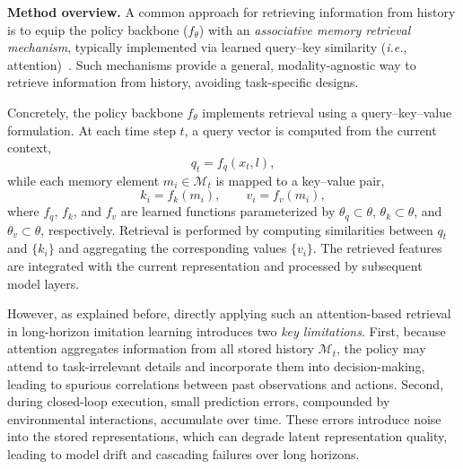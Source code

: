 
\vspace{0.5em}
\noindent
\textbf{Method overview.}
A common approach for retrieving information from history is to equip the policy backbone ($f_\theta$) with an \emph{associative memory retrieval mechanism}, typically implemented via learned query--key similarity (\textit{i.e.}, attention)~\cite{vaswani2017attention}.
Such mechanisms provide a general, modality-agnostic way to retrieve information from history, avoiding task-specific designs.

Concretely, the policy backbone $f_\theta$ implements retrieval using a query--key--value formulation.
At each time step $t$, a query vector is computed from the current context,
\[
q_t = f_q(x_t, l),
\]
while each memory element $m_i \in \mathcal{M}_t$ is mapped to a key--value pair,
\[
k_i = f_k(m_i), \qquad v_i = f_v(m_i),
\]
where $f_q$, $f_k$, and $f_v$ are learned functions parameterized by $\theta_q \subset \theta$, $\theta_k \subset \theta$, and $\theta_v \subset \theta$, respectively.
Retrieval is performed by computing similarities between $q_t$ and $\{k_i\}$ and aggregating the corresponding values $\{v_i\}$.
The retrieved features are integrated with the current representation and processed by subsequent model layers.

However, as explained before, directly applying such an attention-based retrieval in long-horizon imitation learning introduces two \emph{key limitations}.
First, because attention aggregates information from all stored history $\mathcal{M}_t$, the policy may attend to task-irrelevant details and incorporate them into decision-making, leading to spurious correlations between past observations and actions.
Second, during closed-loop execution, small prediction errors, compounded by environmental interactions, accumulate over time.
These errors introduce noise into the stored representations, which can degrade latent representation quality, leading to model drift and cascading failures over long horizons.

